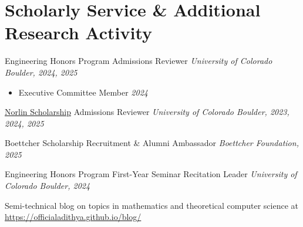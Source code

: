 \documentclass[a4paper,20pt]{article}
\begin{document}
  \section{Scholarly Service \& Additional Research Activity}
    \begin{description}[font=$\bullet$]
    \item Engineering Honors Program Admissions Reviewer \hfill \textit{University of Colorado Boulder, 2024, 2025}
    \vspace{-5pt}
    \begin{itemize}[label=-]
      \item Executive Committee Member \hspace{\fill} \textit{2024}
    \end{itemize}
    \vspace{-10pt}
    \item \href{https://www.colorado.edu/boettcher-daniels-norlin-scholars/norlin-scholars}{Norlin Scholarship} Admissions Reviewer \hfill \textit{University of Colorado Boulder, 2023, 2024, 2025}
    \vspace{-5pt}
    \item Boettcher Scholarship Recruitment \& Alumni Ambassador \hfill \textit{Boettcher Foundation, 2025}
    \vspace{-5pt}
    \item Engineering Honors Program First-Year Seminar Recitation Leader \hfill \textit{University of Colorado Boulder, 2024}
    \vspace{-5pt}
    \item Semi-technical blog on topics in mathematics and theoretical computer science at \href{https://officialadithya.github.io/blog/}{https://officialadithya.github.io/blog/}
    \vspace{-5pt}
    \end{description}
\end{document}
